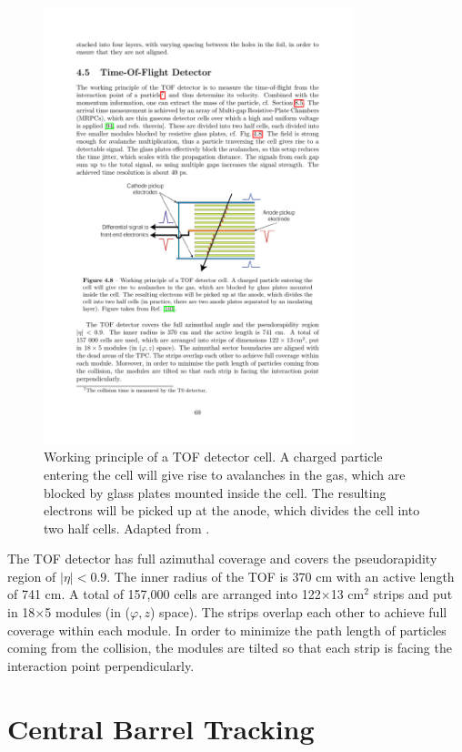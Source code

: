 \begin{figure}[htpb]
  \centering
  \includegraphics[width=0.8\textwidth]{Experimental_Aparatus/TOF.pdf}
  \caption{Working principle of a TOF detector cell. A charged particle entering the cell will give rise to avalanches in the gas, which are blocked by glass plates mounted inside the cell. The resulting electrons will be picked up at the anode, which divides the cell into two half cells. Adapted from \cite{Adolfsson2020}.}
  \label{fig:TOF}
\end{figure}

The TOF detector has full azimuthal coverage and covers the pseudorapidity region of $|\eta| < 0.9$. The inner radius of the TOF is 370 cm with an active length of 741 cm. A total of 157,000 cells are arranged into 122$\times$13 cm$^2$ strips and put in 18$\times$5 modules (in ($\varphi,z$) space). The strips overlap each other to achieve full coverage within each module. In order to minimize the path length of particles coming from the collision, the modules are tilted so that each strip is facing the interaction point perpendicularly.

\section{Central Barrel Tracking}

